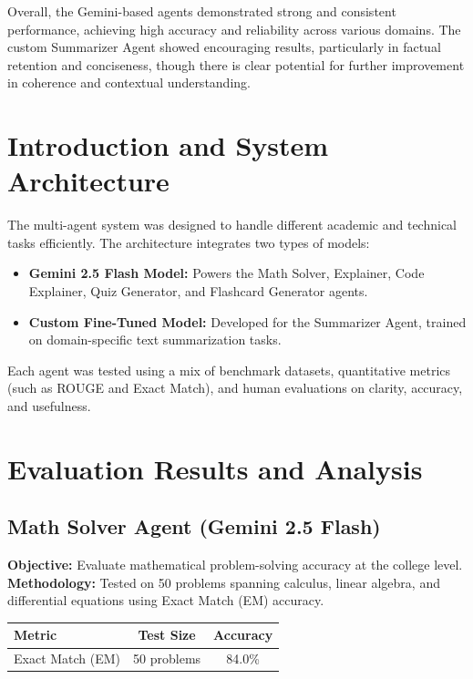 \documentclass[12pt,a4paper]{article}
\newcommand{\labelitem}[1]{\textbf{#1:}\hspace{0.5em}}
\begin{document}
Overall, the Gemini-based agents demonstrated strong and consistent performance, achieving high accuracy and reliability across various domains. The custom Summarizer Agent showed encouraging results, particularly in factual retention and conciseness, though there is clear potential for further improvement in coherence and contextual understanding.

\section{Introduction and System Architecture}
The multi-agent system was designed to handle different academic and technical tasks efficiently. The architecture integrates two types of models:

\begin{itemize}
    \item \textbf{Gemini 2.5 Flash Model:} Powers the Math Solver, Explainer, Code Explainer, Quiz Generator, and Flashcard Generator agents.
    \item \textbf{Custom Fine-Tuned Model:} Developed for the Summarizer Agent, trained on domain-specific text summarization tasks.
\end{itemize}

Each agent was tested using a mix of benchmark datasets, quantitative metrics (such as ROUGE and Exact Match), and human evaluations on clarity, accuracy, and usefulness.

\section{Evaluation Results and Analysis}

\subsection{Math Solver Agent (Gemini 2.5 Flash)}
\labelitem{Objective} Evaluate mathematical problem-solving accuracy at the college level.\\
\labelitem{Methodology} Tested on 50 problems spanning calculus, linear algebra, and differential equations using Exact Match (EM) accuracy.

\begin{table}[H]
\centering
\begin{tabular}{lcc}
\toprule
\textbf{Metric} & \textbf{Test Size} & \textbf{Accuracy} \\
\midrule
Exact Match (EM) & 50 problems & 84.0\% \\
\bottomrule
\end{tabular}
\end{table}
\end{document}
